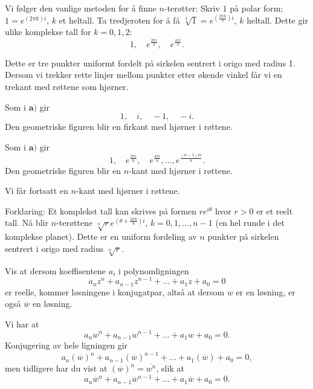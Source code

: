 \begin{losning}

\begin{punkt}
Vi følger den vanlige metoden for å finne $n$-terøtter: Skriv $1$ på polar form; $1=e^{(2\pi k )i}$, $k$ et heltall. Ta tredjeroten for å få $\sqrt[3]{1}=e^{(\frac{2\pi k}{3} )i}$, $k$ heltall. Dette gir ulike komplekse tall for $k=0,1,2$: 
$$1,\quad e^{\frac{2\pi i}{3}}, \quad e^{\frac{4\pi i}{3}}.$$ 

\noindent
Dette er tre punkter uniformt fordelt på sirkelen sentrert i origo med radius 1. Dersom vi trekker rette linjer mellom punkter etter økende vinkel får vi en trekant med røttene som hjørner.
\end{punkt}

\begin{punkt}
Som i $\textbf{a)}$ gir $$1,\quad i,\quad -1, \quad -i. $$ Den geometriske figuren blir en firkant med hjørner i røttene.
\end{punkt}

\begin{punkt}
Som i $\textbf{a)}$ gir $$1,\quad e^{\frac{2\pi i}{n}},\quad e^{\frac{4\pi i}{n}},\dots,e^{\frac{(n-1)\pi i}{n}}.$$ Den geometriske figuren blir en $n$-kant med hjørner i røttene.
\end{punkt}

\begin{punkt}
Vi får fortsatt en $n$-kant med hjørner i røttene.

\noindent
Forklaring: Et komplekst tall kan skrives på formen $re^{i\theta}$ hvor $r>0$ er et reelt tall. Nå blir $n$-terøttene $\sqrt[n]{r}e^{(\theta+\frac{2\pi k}{n})i}$, $k=0,1,\dots, n-1$ (en hel runde i det komplekse planet). Dette er en uniform fordeling av $n$ punkter på sirkelen sentrert i origo med radius $\sqrt[n]{r}$.
\end{punkt}

\end{losning}


\begin{oppgave}
Vis at dersom koeffisentene $a_i$ i polynomligningen
\[
a_nz^n+a_{n-1}z^{n-1}+...+a_1z+a_0=0
\]
er reelle, kommer løsningene i konjugatpar, altså at dersom $w$ er en løsning, er også $\overline w$ en løsning.
\end{oppgave}

\begin{losning}
Vi har at
\[
a_nw^n+a_{n-1}w^{n-1}+...+a_1w+a_0=0.
\]
Konjugering av hele ligningen gir 
\[
a_n(\overline w)^n+a_{n-1}(\overline w)^{n-1}+...+a_1(\overline w)+a_0=0,
\]
men tidligere har du vist at $(\overline w)^n=\overline {w^n}$, slik at 
\[
a_n\overline w^n+a_{n-1}\overline w^{n-1}+...+a_1\overline w+a_0=0.
\]



\end{losning}



